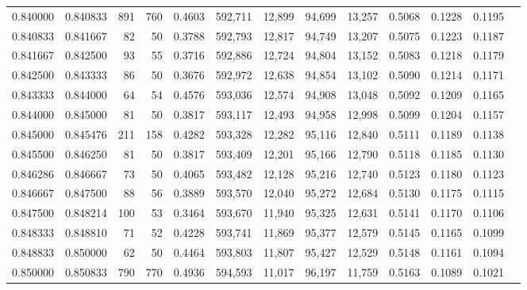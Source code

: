 \begin{tabular}{rrrrrrrrrrrrr}
0.840000 & 0.840833 &   891 & 760 &                                     0.4603 & 592,711 &  12,899 &  94,699 &  13,257 & 0.5068 & 0.1228 & 0.1195 \\
0.840833 & 0.841667 &    82 &  50 &                                     0.3788 & 592,793 &  12,817 &  94,749 &  13,207 & 0.5075 & 0.1223 & 0.1187 \\
0.841667 & 0.842500 &    93 &  55 &                                     0.3716 & 592,886 &  12,724 &  94,804 &  13,152 & 0.5083 & 0.1218 & 0.1179 \\
0.842500 & 0.843333 &    86 &  50 &                                     0.3676 & 592,972 &  12,638 &  94,854 &  13,102 & 0.5090 & 0.1214 & 0.1171 \\
0.843333 & 0.844000 &    64 &  54 &                                     0.4576 & 593,036 &  12,574 &  94,908 &  13,048 & 0.5092 & 0.1209 & 0.1165 \\
0.844000 & 0.845000 &    81 &  50 &                                     0.3817 & 593,117 &  12,493 &  94,958 &  12,998 & 0.5099 & 0.1204 & 0.1157 \\
0.845000 & 0.845476 &   211 & 158 &                                     0.4282 & 593,328 &  12,282 &  95,116 &  12,840 & 0.5111 & 0.1189 & 0.1138 \\
0.845500 & 0.846250 &    81 &  50 &                                     0.3817 & 593,409 &  12,201 &  95,166 &  12,790 & 0.5118 & 0.1185 & 0.1130 \\
0.846286 & 0.846667 &    73 &  50 &                                     0.4065 & 593,482 &  12,128 &  95,216 &  12,740 & 0.5123 & 0.1180 & 0.1123 \\
0.846667 & 0.847500 &    88 &  56 &                                     0.3889 & 593,570 &  12,040 &  95,272 &  12,684 & 0.5130 & 0.1175 & 0.1115 \\
0.847500 & 0.848214 &   100 &  53 &                                     0.3464 & 593,670 &  11,940 &  95,325 &  12,631 & 0.5141 & 0.1170 & 0.1106 \\
0.848333 & 0.848810 &    71 &  52 &                                     0.4228 & 593,741 &  11,869 &  95,377 &  12,579 & 0.5145 & 0.1165 & 0.1099 \\
0.848833 & 0.850000 &    62 &  50 &                                     0.4464 & 593,803 &  11,807 &  95,427 &  12,529 & 0.5148 & 0.1161 & 0.1094 \\
0.850000 & 0.850833 &   790 & 770 &                                     0.4936 & 594,593 &  11,017 &  96,197 &  11,759 & 0.5163 & 0.1089 & 0.1021 \\

\end{tabular}
